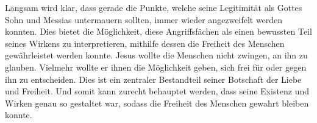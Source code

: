 Langsam wird klar, dass gerade die Punkte, welche seine Legitimität als Gottes Sohn und Messias untermauern sollten, immer wieder angezweifelt werden konnten. Dies bietet die Möglichkeit, diese Angriffsfächen als einen bewussten Teil seines Wirkens zu interpretieren, mithilfe dessen die Freiheit des Menschen gewährleistet werden konnte. Jesus wollte die Menschen nicht zwingen, an ihn zu glauben. Vielmehr wollte er ihnen die Möglichkeit geben, sich frei für oder gegen ihn zu entscheiden. Dies ist ein zentraler Bestandteil seiner Botschaft der Liebe und Freiheit. Und somit kann zurecht behauptet werden, dass seine Existenz und Wirken genau so gestaltet war, sodass die Freiheit des Menschen gewahrt bleiben konnte.\\